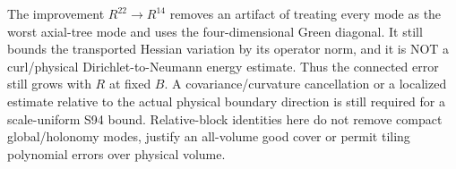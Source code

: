 \documentclass[11pt]{article}
\begin{document}
The improvement $R^{22}\to R^{14}$ removes an artifact of treating every mode
as the worst axial-tree mode and uses the four-dimensional Green diagonal.
It still bounds the transported Hessian variation by its operator norm, and
it is NOT a curl/physical Dirichlet-to-Neumann energy estimate. Thus the
connected error still grows with $R$ at fixed $B$. A covariance/curvature
cancellation or a localized estimate relative to the actual physical boundary
direction is still required for a scale-uniform S94 bound. Relative-block
identities here do not remove compact global/holonomy modes, justify an
all-volume good cover or permit tiling polynomial errors over physical volume.
\end{document}
